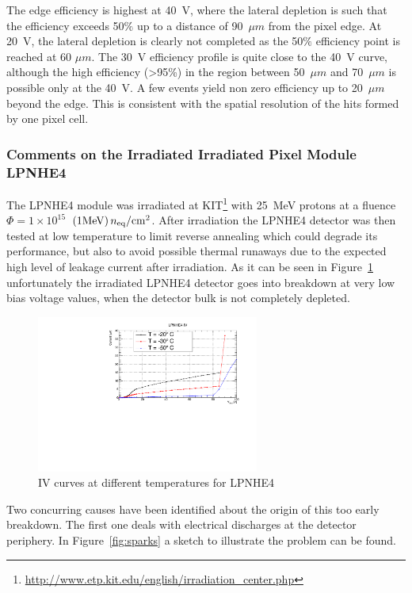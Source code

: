 The edge efficiency is highest at 40~V, where the lateral depletion is such that the efficiency exceeds 50$\%$ up to a distance of 90~$\mu m$ from the pixel edge. At 20~V, the lateral depletion is clearly not completed as the 50$\%$ efficiency point is reached at 60 $\mu m$. The 30~V efficiency profile is quite close to the 40~V curve, although the high efficiency (>95\%) in the region between 50~$\mu m$ and 70~$\mu m$ is possible only at the 40~V. A few events yield non zero efficiency up to 20~$\mu m$ beyond the edge. This is consistent with the spatial resolution of the hits formed by one pixel cell.

\subsubsection{Comments on the Irradiated Irradiated Pixel Module LPNHE4}



The LPNHE4 module was irradiated  at KIT\footnote{\url{http://www.etp.kit.edu/english/irradiation_center.php}}
 with 25~MeV protons at a fluence  $\Phi=1\times10^{15}$~$(1 {\rm MeV})\,n_{\rm eq}/{\rm cm}^{2}$. 
After irradiation the LPNHE4 detector was then tested at low temperature 
to limit reverse annealing which could degrade its performance, but also 
to avoid possible thermal runaways due to the expected high level of 
leakage current after irradiation. 
As it can be seen in Figure~\ref{fig:LPNHE4_IV} unfortunately the irradiated LPNHE4 detector goes into breakdown at very low bias voltage 
values, when the detector bulk is not completely depleted.

\begin{figure}[!htb]
\centering
\includegraphics[width=0.65\textwidth]{LPNHE4_IV.pdf}
\caption{\label{fig:LPNHE4_IV}IV curves at different temperatures for LPNHE4}
\end{figure}


Two concurring causes have been identified about the origin of this too early 
breakdown. The first one deals with  electrical discharges at the 
detector periphery. In Figure~\ref{fig:sparks} a sketch to illustrate the problem can be found. 



